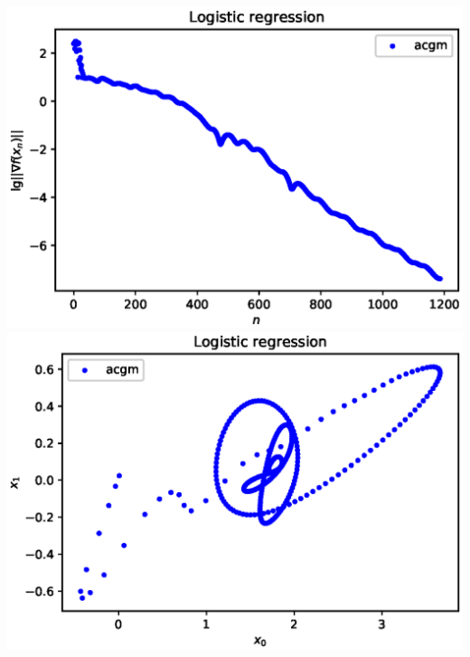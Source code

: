 \documentclass{crm-article}
\begin{document}
\noindent
\includegraphics[scale=0.5]{plots/ill_logr_des.eps}
\includegraphics[scale=0.5]{plots/xy_logr_des.eps}
\end{document}
